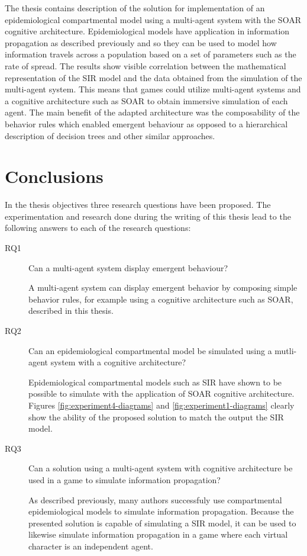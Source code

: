 \label{chapter:conclusions}

The thesis contains description of the solution for implementation of an epidemiological compartmental model using a multi-agent system with the SOAR cognitive architecture.
Epidemiological models have application in information propagation as described previously and so they can be used to model how information travels across a population based on a set of parameters such as the rate of spread.
The results show visible correlation between the mathematical representation of the SIR model and the data obtained from the simulation of the multi-agent system.
This means that games could utilize multi-agent systems and a cognitive architecture such as SOAR to obtain immersive simulation of each agent.
The main benefit of the adapted architecture was the composability of the behavior rules which enabled emergent behaviour as opposed to a hierarchical description of decision trees and other similar approaches.

\section{Conclusions}

In the thesis objectives three research questions have been proposed.
The experimentation and research done during the writing of this thesis lead to the following answers to each of the research questions:

\begin{description}
    \item[RQ1] Can a multi-agent system display emergent behaviour?
    \item[] A multi-agent system can display emergent behavior by composing simple behavior rules, for example using a cognitive architecture such as SOAR, described in this thesis.
    \item[RQ2] Can an epidemiological compartmental model be simulated using a mutli-agent system with a cognitive architecture?
    \item[] Epidemiological compartmental models such as SIR have shown to be possible to simulate with the application of SOAR cognitive architecture. Figures \ref{fig:experiment4-diagrams} and \ref{fig:experiment1-diagrams} clearly show the ability of the proposed solution to match the output the SIR model.
    \item[RQ3] Can a solution using a multi-agent system with cognitive architecture be used in a game to simulate information propagation?
    \item[] As described previously, many authors successfuly use compartmental epidemiological models to simulate information propagation. Because the presented solution is capable of simulating a SIR model, it can be used to likewise simulate information propagation in a game where each virtual character is an independent agent.
\end{description}


